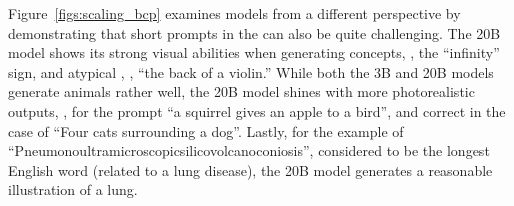 Figure~\ref{figs:scaling_bcp} examines models from a different perspective by demonstrating that short prompts in the \bcpa{} can also be quite challenging. The 20B model shows its strong visual abilities when generating  concepts, \eg, the ``infinity'' sign, and atypical , \eg, ``the back of a violin.'' While both the 3B and 20B models generate animals rather well, the 20B model shines with more photorealistic outputs, \eg, for the prompt ``a squirrel gives an apple to a bird'', and correct  in the case of ``Four cats surrounding a dog''. Lastly, for the  example of ``Pneumonoultramicroscopicsilicovolcanoconiosis'', considered to be the longest English word (related to a lung disease), the 20B model generates a reasonable illustration of a lung.